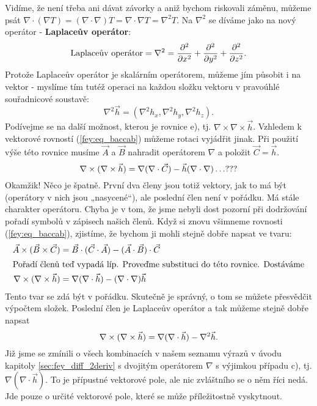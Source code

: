     Vidíme, že není třeba ani dávat závorky a aniž bychom riskovali záměnu, můžeme psát \(\nabla 
    \cdot(\nabla T) = (\nabla\cdot\nabla)T = \nabla\cdot\nabla T = \nabla^2T\). Na \(\nabla^2\) se 
    díváme jako na nový operátor - \textbf{Laplaceův operátor}:
    \begin{equation}\label{fyz:eq687}
      \text{Laplaceův operátor} = \nabla^2 = \dfrac{\partial^2 }{\partial x^2} + \dfrac{\partial^2 }{\partial y^2} + \dfrac{\partial^2 }{\partial z^2}.
    \end{equation}
    Protože Laplaceův operátor je skalárním operátorem, můžeme jím působit i na vektor - myslíme 
    tím tutéž operaci na každou složku vektoru v pravoúhlé souřadnicové soustavě:
    \begin{equation*}
      \nabla^2\vec{h} = (\nabla^2h_x, \nabla^2h_y, \nabla^2h_z).
    \end{equation*}
    Podívejme se na další možnost, kterou je rovnice e), tj. \(\nabla\times\nabla\times\vec{h}\). 
    Vzhledem k vektorové rovností (\ref{fey:eq_baccab}) můžeme rotaci vyjádřit jinak. Při použití 
    výše této rovnice 
    musíme \(\vec{A}\) a \(\vec{B}\) nahradit operátorem \(\nabla\) a položit \(\vec{C} = \vec{h}\).
    \begin{equation*}
      \nabla\times(\nabla\times\vec{h}) = \nabla(\nabla\cdot\vec{C}) - \vec{h}(\nabla\cdot\nabla) \ldots ???
    \end{equation*}
    Okamžik! Něco je špatně. První dva členy jsou totiž vektory, jak to má být (operátory v nich 
    jsou „nasycené“), ale poslední člen není v pořádku. Má stále charakter operátoru. Chyba je v 
    tom, že jsme nebyli dost pozorní při dodržování pořadí symbolů v zápisech našich členů. Když si 
    znovu všimneme rovnosti (\ref{fey:eq_baccab}), zjistíme, že bychom ji mohli stejně dobře napsat 
    ve tvaru:
    \begin{align*}
      \vec{A}\times(\vec{B}\times\vec{C}) 
        &= \vec{B}\cdot(\vec{C}\cdot\vec{A}) - (\vec{A}\cdot\vec{B})\cdot\vec{C}  \\
      \shortintertext{Pořadí členů teď vypadá líp. Proveďme substituci do této rovnice. Dostáváme} 
      \nabla\times(\nabla\times\vec{h})
        &= \nabla(\nabla\cdot\vec{h}) - (\nabla\cdot\nabla)\vec{h} 
    \end{align*}
    Tento tvar se zdá být v pořádku. Skutečně je správný, o tom se můžete přesvědčit výpočtem 
    složek. Poslední člen je Laplaceův operátor a tak můžeme stejně dobře napsat
    \begin{equation*}
      \nabla\times(\nabla\times\vec{h}) = \nabla(\nabla\cdot\vec{h}) - \nabla^2\vec{h}.
    \end{equation*}
    Již jsme se zmínili o všech kombinacích v našem seznamu výrazů v úvodu kapitoly  
    \ref{sec:fey_diff_2deriv} s dvojitým operátorem \(\nabla\) s výjimkou případu c), 
    tj.\(\nabla(\nabla\cdot\vec{h})\). To je přípustné vektorové pole, ale nic zvláštního se o něm 
    říci nedá. Jde pouze o určité vektorové pole, které se může příležitostně vyskytnout.


